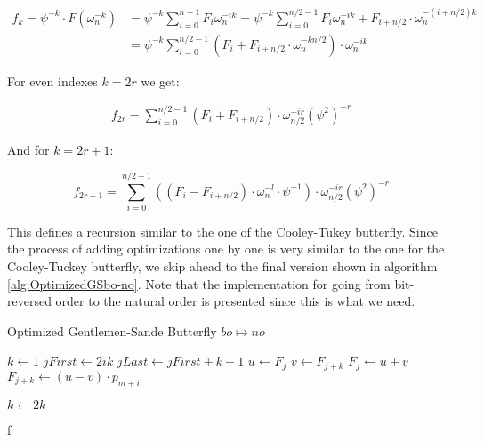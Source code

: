\begin{align*}
    f_k = \psi^{-k} \cdot F(\omega^{-k}_n) &= \psi^{-k} \sum_{i=0}^{n -1} F_i \omega^{-ik}_n = \psi^{-k} \sum_{i=0}^{n/2 -1} F_i \omega^{-ik}_n + F_{i + n/2} \cdot \omega_n^{-(i + n/2)k} \\
    &= \psi^{-k} \sum_{i=0}^{n/2 -1} (F_i + F_{i + n/2} \cdot \omega_n^{-kn/2}) \cdot \omega^{-ik}_n
\end{align*}

For even indexes $k = 2r$ we get:

\begin{align*}
    f_{2r} = \sum_{i=0}^{n/2 -1} (F_i + F_{i + n/2}) \cdot \omega^{-ir}_{n/2} (\psi^2)^{-r}
\end{align*}

And for $k = 2r + 1$:

\begin{equation*}
    f_{2r + 1} = \sum_{i=0}^{n/2 -1} ((F_i - F_{i + n/2}) \cdot \omega_n^{-l} \cdot \psi^{-1}) \cdot \omega^{-ir}_{n/2} (\psi^2)^{-r}
\end{equation*}

This defines a recursion similar to the one of the Cooley-Tukey butterfly. Since the process of adding optimizations one by one is very similar to the one for the Cooley-Tuckey butterfly, we skip ahead to the final version shown in algorithm \cref{alg:OptimizedGSbo-no}. Note that the implementation for going from bit-reversed order to the natural order is presented since this is what we need.

\begin{algorithm}[h]
    \caption{Optimized Gentlemen-Sande Butterfly $bo \mapsto no$}
    \label{alg:OptimizedGSbo-no}
    \begin{algorithmic}[1]

        \State $k \leftarrow 1$
                \State $jFirst \leftarrow 2ik$
                \State $jLast \leftarrow jFirst + k - 1$
                    \State $u \leftarrow F_{j}$
                    \State $v \leftarrow F_{j + k}$
                    \State $F_{j} \leftarrow u + v$
                    \State $F_{j + k} \leftarrow (u - v) \cdot p_{m + i}$
                \EndFor
            \EndFor

            \State $k \leftarrow 2k$
        \EndFor

        \Return f

    \EndProcedure

    \end{algorithmic}
\end{algorithm}

